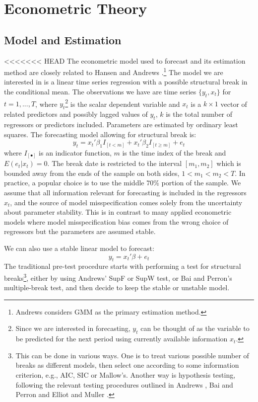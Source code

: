 \section{Econometric Theory}
\subsection{Model and Estimation}
<<<<<<< HEAD
The econometric model used to forecast and its estimation method are closely related to Hansen \cite{hansen2009averaging} and Andrews \cite{andrews93}.\footnote{Andrews considers GMM as the primary estimation method.} The model we are interested in is a linear time series regression with a possible structural break in the conditional mean. The observations we have are time series $\{y_t,x_t\}$ for $t = 1,...,T$, where $y_t$\footnote{Since we are interested in forecasting, $y_t$ can be thought of as the variable to be predicted for the next period using currently available information $x_t$.} is the scalar dependent variable and $x_t$ is a $k\times 1$ vector of related predictors and possibly lagged values of $y_t$, $k$ is the total number of regressors or predictors included. Parameters are estimated by ordinary least squares. The forecasting model allowing for structural break is:
\begin{equation} \label{mod:1}
	y_t = x_t'\beta_1 I_{[t<m]} + x_t'\beta_2 I_{[t \geq m]} + e_t
\end{equation}
where $I_{[\bullet]}$ is an indicator function, $m$ is the time index of the break and $E(e_t|x_t) = 0$. The break date is restricted to the interval $[m_1,m_2]$ which is bounded away from the ends of the sample on both sides, $1 < m_{1} < m_{2} < T$. In practice, a popular choice is to use the middle $70\%$ portion of the sample. We assume that all information relevant for forecasting is included in the regressors $x_t$, and the source of model misspecification comes solely from the uncertainty about parameter stability. This is in contrast to many applied econometric models where model misspecification bias comes from the wrong choice of regressors but the parameters are assumed stable.

We can also use a stable linear model to forecast:
\begin{equation} \label{mod:2}
	y_t = x_t'\beta + e_t
\end{equation}
The traditional pre-test procedure starts with performing a test for structural breaks\footnote{This can be done in various ways. One is to treat various possible number of breaks as different models, then select one according to some information criterion, e.g., AIC, SIC or Mallow's. Another way is hypothesis testing, following the relevant testing procedures outlined in Andrews \cite{andrews93}, Bai and Perron \cite{bai_perron98} and Elliot and Muller \cite{elliott_muller_RES2006}.}, either by using Andrews' SupF or SupW test, or Bai and Perron's multiple-break test, and then decide to keep the stable or unstable model.

